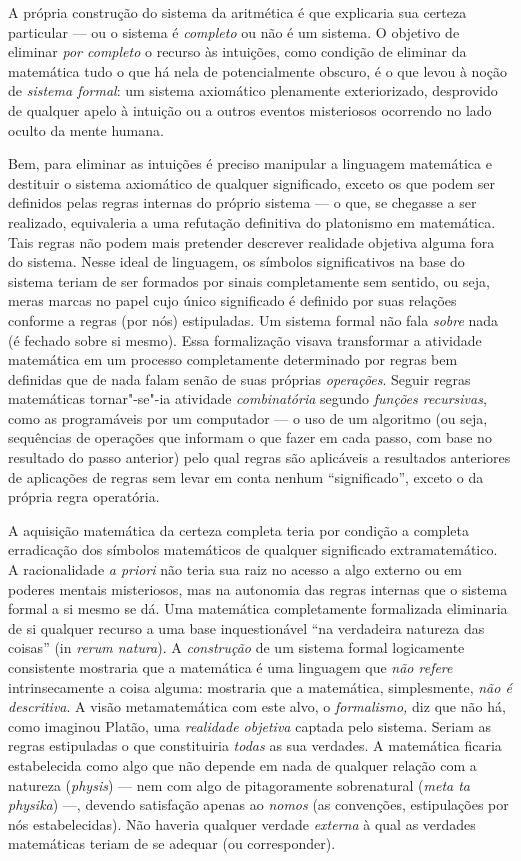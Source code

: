 {A própria construção do sistema da aritmética é que
explicaria sua certeza particular --- ou o sistema é
\emph{completo} ou não é um sistema. O objetivo de eliminar
\emph{por completo} o recurso às intuições, como condição de
eliminar da matemática tudo o que há nela de potencialmente
obscuro, é o que levou à noção de \emph{sistema formal}: um
sistema axiomático plenamente exteriorizado, desprovido de
qualquer apelo à intuição ou a outros eventos misteriosos
ocorrendo no lado oculto da mente humana.

Bem, para eliminar as intuições é preciso manipular a
linguagem matemática e destituir o sistema axiomático de
qualquer significado, exceto os que podem ser definidos pelas
regras internas do próprio sistema --- o que, se chegasse a ser
realizado, equivaleria a uma refutação definitiva do platonismo
em matemática. Tais regras não podem mais pretender descrever
realidade objetiva alguma fora do sistema. Nesse ideal de
linguagem, os símbolos significativos na base do sistema teriam
de ser formados por sinais completamente sem sentido, ou seja,
meras marcas no papel cujo único significado é definido por suas
relações conforme a regras (por nós) estipuladas. Um sistema
formal não fala \emph{sobre} nada (é fechado sobre si mesmo).
Essa formalização visava transformar a atividade matemática em
um processo completamente determinado por regras bem definidas
que de nada falam senão de suas próprias \emph{operações}.
Seguir regras matemáticas tornar"-se"-ia atividade
\emph{combinatória} segundo \emph{funções recursivas}, como
as programáveis por um computador --- o uso de um algoritmo (ou
seja, sequências de operações que informam o que fazer em cada
passo, com base no resultado do passo anterior) pelo qual regras
são aplicáveis a resultados anteriores de aplicações de regras
sem levar em conta nenhum
``significado'', exceto o da
própria regra operatória.

A aquisição matemática da certeza completa teria por condição
a completa erradicação dos símbolos matemáticos de qualquer
significado extramatemático. A racionalidade \emph{a priori}
não teria sua raiz no acesso a algo externo ou em poderes
mentais misteriosos, mas na autonomia das regras internas que o
sistema formal a si mesmo se dá. Uma matemática completamente
formalizada eliminaria de si qualquer recurso a uma base
inquestionável “na verdadeira natureza das coisas” (in
\emph{rerum natura}). A \emph{construção} de um sistema
formal logicamente consistente mostraria que a matemática é uma
linguagem que \emph{não refere} intrinsecamente a coisa
alguma: mostraria que a matemática, simplesmente, \emph{não é
descritiva}. A visão metamatemática com este alvo, o
\emph{formalismo,} diz que não há, como imaginou Platão, uma
\emph{realidade objetiva} captada pelo sistema. Seriam as
regras estipuladas o que constituiria \emph{todas} as sua
verdades. A matemática ficaria estabelecida como algo que não
depende em nada de qualquer relação com a natureza
(\emph{physis}) --- nem com algo de pitagoramente sobrenatural
(\emph{meta ta physika}) ---, devendo satisfação apenas ao
\emph{nomos} (as convenções, estipulações por nós
estabelecidas). Não haveria qualquer verdade \emph{externa} à
qual as verdades matemáticas teriam de se adequar (ou
corresponder).

}
